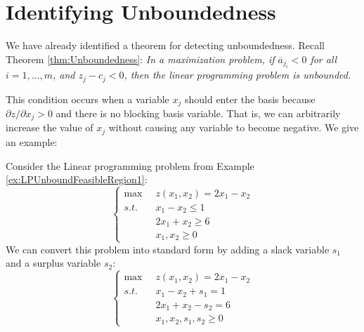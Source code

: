 \section{Identifying Unboundedness}
We have already identified a theorem for detecting unboundedness. Recall Theorem \ref{thm:Unboundedness}:
\textit{In a maximization problem, if $\overline{a}_{j_i} < 0$ for all $i = 1,\dots,m$, and $z_j - c_j < 0$, then the linear programming problem is unbounded.}

This condition occurs when a variable $x_j$ should enter the basis because $\partial{z}/\partial{x_j} > 0$ and there is no blocking basis variable. That is, we can arbitrarily increase the value of $x_j$ without causing any variable to become negative. We give an example:
\begin{example} Consider the Linear programming problem from Example \ref{ex:LPUnboundFeasibleRegion1}:
\begin{displaymath}
\left\{
\begin{aligned}
\max\;\;& z(x_1,x_2) = 2x_1 - x_2\\
s.t.\;\;& x_1 - x_2 \leq 1\\
& 2x_1 + x_2 \geq 6\\
&x_1,x_2 \geq 0
\end{aligned}
\right.
\end{displaymath}
We can convert this problem into standard form by adding a slack variable $s_1$ and a surplus variable $s_2$:
\begin{displaymath}
\left\{
\begin{aligned}
\max\;\;& z(x_1,x_2) = 2x_1 - x_2\\
s.t.\;\;& x_1 - x_2 + s_1 = 1\\
& 2x_1 + x_2 - s_2 = 6\\
&x_1,x_2,s_1,s_2 \geq 0
\end{aligned}
\right.
\end{displaymath}


\end{example}
